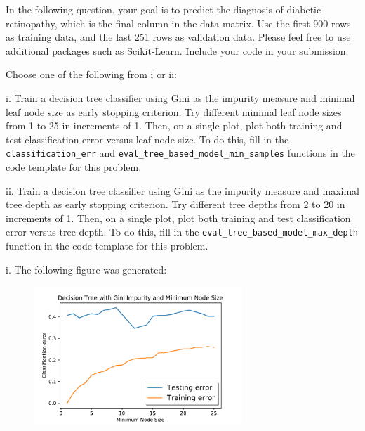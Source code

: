 In the following question, your goal is to predict the diagnosis of diabetic retinopathy, which is the final column in the data matrix.  Use the first 900 rows as training data, and the last
251 rows as validation data. Please feel free to use additional packages such as Scikit-Learn. Include your code in your submission.


\indent\problem[10] \smallskip 
Choose one of the following from i or ii: 

\noindent i. Train a decision tree classifier using Gini as the impurity measure and minimal leaf node size as early stopping criterion. Try different minimal leaf node sizes from 1 to 25 in increments of 1. Then, on a single plot, plot both training and test classification error versus leaf node size. To do this, fill in the \texttt{classification_err} and \texttt{eval_tree_based_model_min_samples} functions in the code template for this problem.


ii. Train a decision tree classifier using Gini as the impurity measure and maximal tree depth as early stopping criterion. Try different tree depths from 2 to 20 in increments of 1. Then, on a single plot, plot both training and test classification error versus tree depth. To do this, fill in the \texttt{eval_tree_based_model_max_depth} function in the code template for this problem.

\begin{solution}
 
     i. The following figure was generated:
     \begin{figure}[H]
        \begin{center}
        \includegraphics[width=0.7\textwidth]{DT_min_leaf.pdf}
        \end{center}
        \end{figure}
 
\end{solution}

